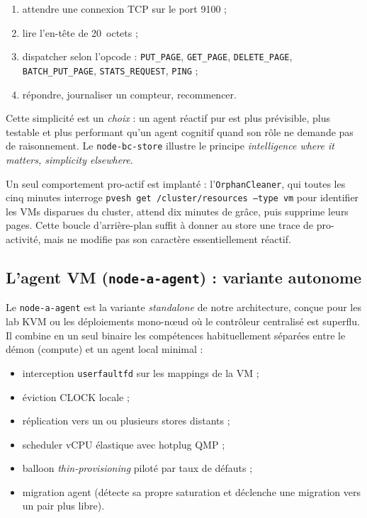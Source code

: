 \begin{enumerate}[leftmargin=*]
    \item attendre une connexion TCP sur le port 9100 ;
    \item lire l'en-tête de 20~octets ;
    \item dispatcher selon l'opcode : \texttt{PUT\_PAGE}, \texttt{GET\_PAGE}, \texttt{DELETE\_PAGE}, \texttt{BATCH\_PUT\_PAGE}, \texttt{STATS\_REQUEST}, \texttt{PING} ;
    \item répondre, journaliser un compteur, recommencer.
\end{enumerate}

Cette simplicité est un \emph{choix} : un agent réactif pur est plus prévisible, plus testable et plus performant qu'un agent cognitif quand son rôle ne demande pas de raisonnement. Le \texttt{node-bc-store} illustre le principe \og{}\emph{intelligence where it matters, simplicity elsewhere}\fg{}.

Un seul comportement pro-actif est implanté : l'\texttt{OrphanCleaner}, qui toutes les cinq minutes interroge \texttt{pvesh get /cluster/resources --type vm} pour identifier les VMs disparues du cluster, attend dix minutes de grâce, puis supprime leurs pages. Cette boucle d'arrière-plan suffit à donner au store une trace de pro-activité, mais ne modifie pas son caractère essentiellement réactif.

\subsection{L'agent VM (\texttt{node-a-agent}) : variante autonome}

Le \texttt{node-a-agent} est la variante \emph{standalone} de notre architecture, conçue pour les lab KVM ou les déploiements mono-nœud où le contrôleur centralisé est superflu. Il combine en un seul binaire les compétences habituellement séparées entre le démon (compute) et un agent local minimal :

\begin{itemize}[leftmargin=*]
    \item interception \texttt{userfaultfd} sur les mappings de la VM ;
    \item éviction CLOCK locale ;
    \item réplication vers un ou plusieurs stores distants ;
    \item scheduler vCPU élastique avec hotplug QMP ;
    \item balloon \emph{thin-provisioning} piloté par taux de défauts ;
    \item migration agent (détecte sa propre saturation et déclenche une migration vers un pair plus libre).
\end{itemize}

